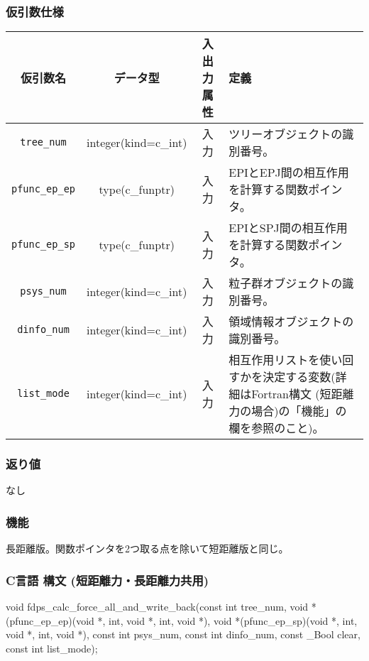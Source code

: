 \subsubsection*{仮引数仕様}
\begin{table}[h]
\begin{tabularx}{\linewidth}{cccX}
\toprule
\rowcolor{Snow2}
仮引数名 & データ型 & 入出力属性 & 定義 \\
\midrule
\verb|tree_num|    & integer(kind=c\_int)   & 入力     & ツリーオブジェクトの識別番号。\\
\verb|pfunc_ep_ep| & type(c\_funptr)        & 入力     & EPIとEPJ間の相互作用を計算する関数ポインタ。\\
\verb|pfunc_ep_sp| & type(c\_funptr)        & 入力     & EPIとSPJ間の相互作用を計算する関数ポインタ。\\
\verb|psys_num|    & integer(kind=c\_int)   & 入力     & 粒子群オブジェクトの識別番号。\\
\verb|dinfo_num|   & integer(kind=c\_int)   & 入力     & 領域情報オブジェクトの識別番号。\\
\verb|list_mode|   & integer(kind=c\_int)   & 入力     & 相互作用リストを使い回すかを決定する変数(詳細はFortran構文 (短距離力の場合)の「機能」の欄を参照のこと)。\\
\bottomrule
\end{tabularx}
\end{table}

\subsubsection*{返り値}
なし

\subsubsection*{機能}
長距離版。関数ポインタを2つ取る点を除いて短距離版と同じ。
\clearpage

\subsubsection*{C言語 構文 (短距離力・長距離力共用)}
\begin{screen}
\begin{spverbatim}
void fdps_calc_force_all_and_write_back(const int tree_num,
                                        void *(pfunc_ep_ep)(void *, int, void *, int, void *),
                                        void *(pfunc_ep_sp)(void *, int, void *, int, void *),
                                        const int psys_num,
                                        const int dinfo_num,
                                        const _Bool clear,
                                        const int list_mode);
\end{spverbatim}
\end{screen}

